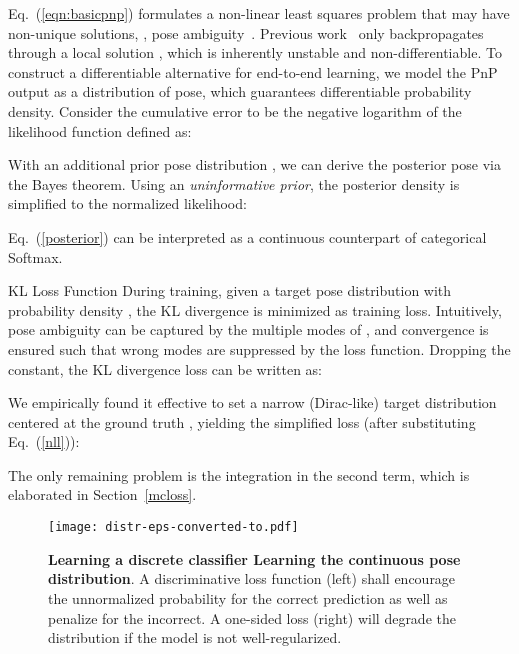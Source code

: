 \documentclass[10pt,twocolumn,letterpaper]{article}
\makeatletter
\renewcommand{\paragraph}{
  \@startsection{paragraph}{4}
  {\z@}{1.0ex \@plus 0ex \@minus .3ex}{-1em}
  {\normalfont\normalsize\bfseries}
}
\makeatother
\begin{document}
Eq.~(\ref{eqn:basicpnp}) formulates a non-linear least squares problem that may have non-unique solutions, \ie, pose ambiguity~\cite{manhardt2019, Schweighofer2006}. Previous work~\cite{dsac++, BPnP, blindpnp} only backpropagates through a local solution , which is inherently unstable and non-differentiable.
To construct a differentiable alternative for end-to-end learning, we model the PnP output as a distribution of pose, which guarantees differentiable probability density. Consider the cumulative error to be the negative logarithm of the likelihood function  defined as:

With an additional prior pose distribution , we can derive the posterior pose  via the Bayes theorem. Using an \emph{uninformative prior}, the posterior density is simplified to the normalized likelihood:

Eq.~(\ref{posterior}) can be interpreted as a continuous counterpart of categorical Softmax.

\paragraph{KL Loss Function}
During training, given a target pose distribution with probability density , the KL divergence  is minimized as training loss. Intuitively, pose ambiguity can be captured by the multiple modes of , and convergence is ensured such that wrong modes are suppressed by the loss function. Dropping the constant, the KL divergence loss can be written as:

We empirically found it effective to set a narrow (Dirac-like) target distribution centered at the ground truth , yielding the simplified loss (after substituting Eq.~(\ref{nll})):

The only remaining problem is the integration in the second term, which is elaborated in Section~\ref{mcloss}.

\begin{figure}[t]
\begin{center}
    \texttt{[image: distr-eps-converted-to.pdf]}
\end{center}
\vspace{-1ex}
\caption{\textbf{Learning a discrete classifier \vs Learning the continuous pose distribution}. A discriminative loss function (left) shall encourage the unnormalized probability for the correct prediction as well as penalize for the incorrect. 
A one-sided loss (right) will degrade the distribution if the model is not well-regularized.}
\label{fig:distr}
\end{figure}
\end{document}
